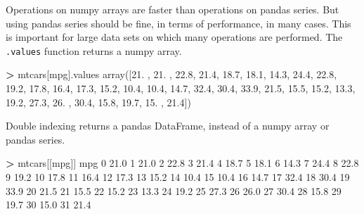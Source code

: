 \documentclass[
]{book}
\newenvironment{Shaded}{\begin{snugshade}}{\end{snugshade}}
\newcommand{\DecValTok}[1]{\textcolor[rgb]{0.00,0.00,0.81}{#1}}
\newcommand{\FloatTok}[1]{\textcolor[rgb]{0.00,0.00,0.81}{#1}}
\newcommand{\NormalTok}[1]{#1}
\newcommand{\OperatorTok}[1]{\textcolor[rgb]{0.81,0.36,0.00}{\textbf{#1}}}
\newcommand{\StringTok}[1]{\textcolor[rgb]{0.31,0.60,0.02}{#1}}
\begin{document}
Operations on numpy arrays are faster than operations on pandas series. But using pandas series should be fine, in terms of performance, in many cases. This is important for large data sets on which many operations are performed. The \texttt{.values} function returns a numpy array.

\begin{Shaded}
\begin{Highlighting}[]
\OperatorTok{\textgreater{}}\NormalTok{ mtcars[}\StringTok{\textquotesingle{}mpg\textquotesingle{}}\NormalTok{].values}
\NormalTok{array([}\FloatTok{21.}\NormalTok{ , }\FloatTok{21.}\NormalTok{ , }\FloatTok{22.8}\NormalTok{, }\FloatTok{21.4}\NormalTok{, }\FloatTok{18.7}\NormalTok{, }\FloatTok{18.1}\NormalTok{, }\FloatTok{14.3}\NormalTok{, }\FloatTok{24.4}\NormalTok{, }\FloatTok{22.8}\NormalTok{, }\FloatTok{19.2}\NormalTok{, }\FloatTok{17.8}\NormalTok{,}
       \FloatTok{16.4}\NormalTok{, }\FloatTok{17.3}\NormalTok{, }\FloatTok{15.2}\NormalTok{, }\FloatTok{10.4}\NormalTok{, }\FloatTok{10.4}\NormalTok{, }\FloatTok{14.7}\NormalTok{, }\FloatTok{32.4}\NormalTok{, }\FloatTok{30.4}\NormalTok{, }\FloatTok{33.9}\NormalTok{, }\FloatTok{21.5}\NormalTok{, }\FloatTok{15.5}\NormalTok{,}
       \FloatTok{15.2}\NormalTok{, }\FloatTok{13.3}\NormalTok{, }\FloatTok{19.2}\NormalTok{, }\FloatTok{27.3}\NormalTok{, }\FloatTok{26.}\NormalTok{ , }\FloatTok{30.4}\NormalTok{, }\FloatTok{15.8}\NormalTok{, }\FloatTok{19.7}\NormalTok{, }\FloatTok{15.}\NormalTok{ , }\FloatTok{21.4}\NormalTok{])}
\end{Highlighting}
\end{Shaded}

Double indexing returns a pandas DataFrame, instead of a numpy array or pandas series.

\begin{Shaded}
\begin{Highlighting}[]
\OperatorTok{\textgreater{}}\NormalTok{ mtcars[[}\StringTok{\textquotesingle{}mpg\textquotesingle{}}\NormalTok{]]}
\NormalTok{     mpg}
\DecValTok{0}   \FloatTok{21.0}
\DecValTok{1}   \FloatTok{21.0}
\DecValTok{2}   \FloatTok{22.8}
\DecValTok{3}   \FloatTok{21.4}
\DecValTok{4}   \FloatTok{18.7}
\DecValTok{5}   \FloatTok{18.1}
\DecValTok{6}   \FloatTok{14.3}
\DecValTok{7}   \FloatTok{24.4}
\DecValTok{8}   \FloatTok{22.8}
\DecValTok{9}   \FloatTok{19.2}
\DecValTok{10}  \FloatTok{17.8}
\DecValTok{11}  \FloatTok{16.4}
\DecValTok{12}  \FloatTok{17.3}
\DecValTok{13}  \FloatTok{15.2}
\DecValTok{14}  \FloatTok{10.4}
\DecValTok{15}  \FloatTok{10.4}
\DecValTok{16}  \FloatTok{14.7}
\DecValTok{17}  \FloatTok{32.4}
\DecValTok{18}  \FloatTok{30.4}
\DecValTok{19}  \FloatTok{33.9}
\DecValTok{20}  \FloatTok{21.5}
\DecValTok{21}  \FloatTok{15.5}
\DecValTok{22}  \FloatTok{15.2}
\DecValTok{23}  \FloatTok{13.3}
\DecValTok{24}  \FloatTok{19.2}
\DecValTok{25}  \FloatTok{27.3}
\DecValTok{26}  \FloatTok{26.0}
\DecValTok{27}  \FloatTok{30.4}
\DecValTok{28}  \FloatTok{15.8}
\DecValTok{29}  \FloatTok{19.7}
\DecValTok{30}  \FloatTok{15.0}
\DecValTok{31}  \FloatTok{21.4}
\end{Highlighting}
\end{Shaded}
\end{document}

